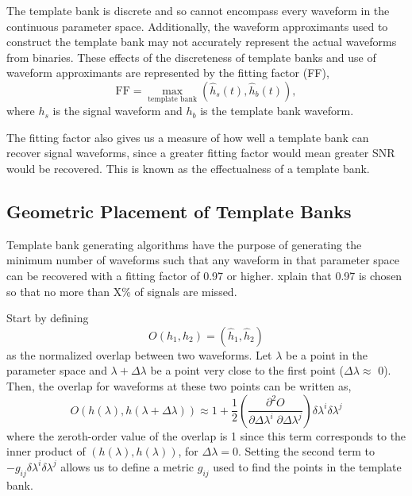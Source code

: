 \documentclass{article}
\newcommand{\red}[1]{{\color{red}{#1}\xspace}}
\begin{document}
The template bank is discrete and so
cannot encompass every waveform in the continuous parameter
space. Additionally, the waveform approximants used to construct
the template bank may not accurately represent the actual waveforms from binaries.  These effects of the discreteness of template banks and use of waveform approximants are represented by the fitting factor (FF),
\begin{equation}
    \text{FF} = \max_\text{template bank}
    \left ( \hat{h}_s(t), \hat{h}_b(t)\right ),
\end{equation}
where $h_s$ is the signal waveform and $h_b$ is the template bank waveform.

The fitting factor also gives us a measure of how well a template bank can recover signal waveforms, since a greater fitting factor would mean greater SNR would be recovered. This is known as the effectualness of a template bank.  

\subsection{Geometric Placement of Template Banks} \label{GeomTmplBank}
Template bank generating algorithms have the purpose of generating the minimum number of waveforms such that any waveform in that parameter space can be recovered with a fitting factor of 0.97 or higher.
{\red Explain that 0.97 is chosen so that no more than  X\% of signals
are missed.}

Start by defining
\begin{equation}
    O(h_1, h_2) = \left( \hat{h}_1, \hat{h}_2\right)
\end{equation}
as the normalized overlap between two waveforms. Let $\lambda$ be a point in the parameter space and $\lambda + \Delta\lambda$ be a point very close to the first point ($\Delta\lambda \approx $ 0).
Then, the overlap for waveforms at these two points can be written as,
\begin{equation}
    O(h(\lambda), h(\lambda + \Delta\lambda)) \approx 1 + \frac{1}{2} \left (\frac{\partial^2O}{\partial\Delta\lambda^i \; \partial\Delta\lambda^j} \right) \delta\lambda^i \delta\lambda^j
\end{equation}
where the zeroth-order value of the overlap is 1 since this term corresponds to the inner product of $(h(\lambda), h(\lambda))$, for $\Delta\lambda = 0$. Setting the second term
 to $-g_{ij}\delta\lambda^i \delta\lambda^j$ allows us to define a metric $g_{ij}$ used to find the points in the template bank.
\end{document}
